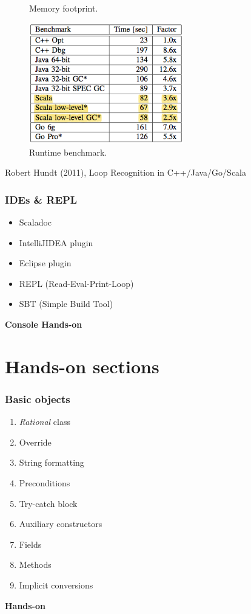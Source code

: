 \documentclass{beamer}
\begin{document}
\begin{frame}
{\begin{figure}[htb]
			\caption{Memory footprint.}
		\end{figure}	
	}	
	 {
		\begin{figure}[htb]
 			\centering
			\includegraphics[width=0.6\textwidth]{05_runtime_benchmark.png}
			\caption{Runtime benchmark.}
		\end{figure}	
	}	
		

	Robert Hundt (2011), Loop Recognition in C++/Java/Go/Scala
\end{frame}

\begin{frame}
	\frametitle{IDEs \& REPL}
	\begin{itemize}
		\item Scaladoc
		\item IntelliJIDEA plugin
		\item Eclipse plugin
		\item REPL (Read-Eval-Print-Loop)
		\item SBT (Simple Build Tool)			
	\end{itemize}
	\begin{center}
	{\huge {\bf Console Hands-on}}
	\end{center}
\end{frame}


\section{Hands-on sections}
\begin{frame}
	\frametitle{Basic objects}
	\begin{enumerate}
		\item {\it Rational} class
		\item Override
		\item String formatting
		\item Preconditions
		\item Try-catch block
		\item Auxiliary constructors
		\item Fields
		\item Methods
		\item Implicit conversions
	\end{enumerate}
	\begin{center}
	{\huge {\bf Hands-on}}
	\end{center}
\end{frame}
\end{document}
